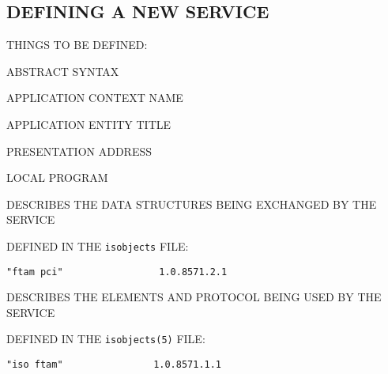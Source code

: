 \begin{bwslide}
\part	{DEFINING A NEW SERVICE}\bf

\begin{nrtc}
\item	THINGS TO BE DEFINED:
    \begin{nrtc}
    \item	ABSTRACT SYNTAX

    \item	APPLICATION CONTEXT NAME

    \item	APPLICATION ENTITY TITLE

    \item	PRESENTATION ADDRESS

    \item	LOCAL PROGRAM
    \end{nrtc}
\end{nrtc}
\end{bwslide}


\begin{bwslide}

\begin{nrtc}
\item	DESCRIBES THE DATA STRUCTURES BEING EXCHANGED BY THE SERVICE

\item	DEFINED IN THE \verb"isobjects" FILE:
\begin{verbatim}
"ftam pci"                 1.0.8571.2.1
\end{verbatim}
\end{nrtc}
\end{bwslide}


\begin{bwslide}

\begin{nrtc}
\item	DESCRIBES THE ELEMENTS AND PROTOCOL BEING USED BY THE SERVICE

\item	DEFINED IN THE \verb"isobjects(5)" FILE:
\begin{verbatim}
"iso ftam"                1.0.8571.1.1
\end{verbatim}
\end{nrtc}
\end{bwslide}



